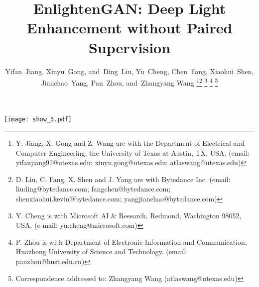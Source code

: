 \documentclass[journal]{IEEEtran}
\begin{document}
\title{EnlightenGAN: Deep Light Enhancement without Paired Supervision}


\author{Yifan~Jiang,
        Xinyu~Gong,
        and~Ding~Liu,
        Yu~Cheng,
        Chen~Fang,
        Xiaohui~Shen,\\
        Jianchao~Yang,
        Pan~Zhou,
        and~Zhangyang Wang
\thanks{Y. Jiang, X. Gong and Z. Wang are with the Department of Electrical and Computer Engineering, the University of Texas at Austin, TX, USA. (email: yifanjiang97@utexas.edu; xinyu.gong@utexas.edu; atlaswang@utexas.edu)}\thanks{D. Liu, C. Fang, X. Shen and J. Yang are with Bytedance Inc. (email: liuding@bytedance.com; fangchen@bytedance.com; shenxiaohui.kevin@bytedance.com;  yangjianchao@bytedance.com)}
\thanks{Y. Cheng is with Microsoft AI \& Research, Redmond, Washington 98052,
USA. (e-mail: yu.cheng@microsoft.com)}
\thanks{P. Zhou is with Department of Electronic Information and Communication, Huazhong University of Science and Technology. (email: panzhou@hust.edu.cn)}
\thanks{Correspondence addressed to: Zhangyang Wang (atlaswang@utexas.edu)}}



















\maketitle
\begin{figure*}[h!]
  \centering
  \texttt{[image: show\_3.pdf]}
  \caption{Representative visual examples by enhancing low-light images using EnlightenGAN. From left to right: columns 1, 3 and 5 are the  low-light input images; while columns 2, 4, an 6 their corresponding enhanced images by EnlightenGAN.}
\end{figure*}
\end{document}
